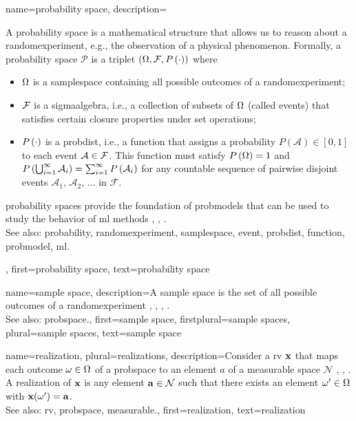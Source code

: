  {name={probability space}, 
 	description={A \gls{probability} space is a mathematical 
 		structure that allows us to reason about a \gls{randomexperiment}, e.g., the observation 
		of a physical phenomenon. 
 	   	Formally, a \gls{probability} space $\mathcal{P}$ is a triplet $(\Omega, \mathcal{F}, P\left(\cdot\right))$ where
 		\begin{itemize} 
 			\item  $\Omega$ is a \gls{samplespace} containing all possible outcomes of a \gls{randomexperiment};
 			\item  $\mathcal{F}$ is a \gls{sigmaalgebra}, i.e., a collection of subsets of 
			$\Omega$ (called \glspl{event}) that satisfies certain closure properties under set operations;
 			\item $P\left(\cdot\right)$ is a \gls{probdist}, i.e., a \gls{function} that assigns a \gls{probability} $P(\mathcal{A}) \in [0,1]$ 
 			to each \gls{event} $\mathcal{A} \in \mathcal{F}$. This \gls{function} must satisfy $P\left(\Omega\right) = 1$ and 
			$P\left(\bigcup_{i=1}^{\infty} \mathcal{A}_i\right) = \sum_{i=1}^{\infty} P\left(\mathcal{A}_i\right)$ for any 
 			countable sequence of pairwise disjoint \glspl{event} $\mathcal{A}_1, \,\mathcal{A}_2, \,\ldots$ in $\mathcal{F}$.
 		\end{itemize}
 		\Gls{probability} spaces provide the foundation of \glspl{probmodel} that can be 
		used to study the behavior of \gls{ml} methods \cite{BillingsleyProbMeasure}, \cite{GrayProbBook}, \cite{ross2013first}.
				\\
		See also: \gls{probability}, \gls{randomexperiment}, \gls{samplespace}, \gls{event}, \gls{probdist}, \gls{function}, \gls{probmodel}, \gls{ml}.},  
 	first={probability space}, 
 	text={probability space}
 }
 
 
  {name={sample space}, 
  	description={A \gls{sample} space is the set of all possible 
		outcomes of a \gls{randomexperiment} \cite{BillingsleyProbMeasure}, 
		\cite{BertsekasProb}, \cite{papoulis}, \cite{AshProbMeasure}. 
		\\
 		See also: \gls{probspace}.},  
  	first={sample space}, 
 	firstplural={sample spaces},
 	plural={sample spaces},
  	text={sample space}
  }
 
	
{name={realization}, plural={realizations},
	description={Consider a \gls{rv} ${\bf x}$ that maps each outcome 
		$\omega \in \Omega$ of a \gls{probspace} to an element $a$ of a 
		\gls{measurable} space $\mathcal{N}$ \cite{RudinBookPrinciplesMatheAnalysis}, \cite{BillingsleyProbMeasure}, \cite{HalmosMeasure}. 
		A realization of ${\bf x}$ is any element ${\bf a} \in \mathcal{N}$ such that there exists 
		an element $\omega' \in \Omega$ with ${\bf x}(\omega') = {\bf a}$.
			\\
		See also: \gls{rv}, \gls{probspace}, \gls{measurable}.}, 
	first={realization},
	text={realization}  
}

